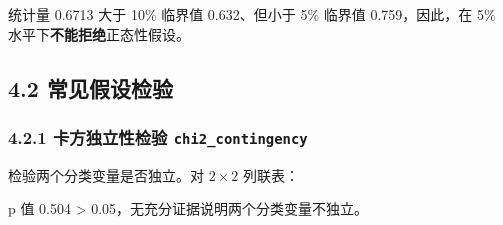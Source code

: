 \begin{Shaded}
\begin{Highlighting}[]
\end{Highlighting}
\end{Shaded}

统计量 0.6713 大于 10\% 临界值 0.632、但小于 5\% 临界值 0.759，因此，在
5\% 水平下\textbf{不能拒绝}正态性假设。

\subsection{4.2
常见假设检验}\label{ux5e38ux89c1ux5047ux8bbeux68c0ux9a8c}

\subsubsection{\texorpdfstring{4.2.1 卡方独立性检验
\texttt{chi2\_contingency}}{4.2.1 卡方独立性检验 chi2\_contingency}}\label{ux5361ux65b9ux72ecux7acbux6027ux68c0ux9a8c-chi2_contingency}

检验两个分类变量是否独立。对 \(2\times2\) 列联表：

\begin{Shaded}
\begin{Highlighting}[]
\OperatorTok{=}\NormalTok{ np.array([[}\NormalTok{, }\NormalTok{], [}\NormalTok{, }\NormalTok{]])}
\OperatorTok{=}
\NormalTok{(}\SpecialCharTok{\{}\SpecialCharTok{\{}\SpecialCharTok{\{}\SpecialCharTok{\}}\NormalTok{)}
\end{Highlighting}
\end{Shaded}

\begin{Shaded}
\begin{Highlighting}[]
\end{Highlighting}
\end{Shaded}

p 值 0.504 \textgreater{} 0.05，无充分证据说明两个分类变量不独立。

